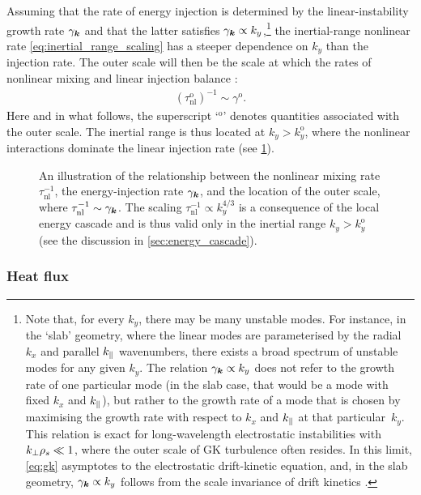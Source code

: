 \documentclass{jpp}
\newcommand{\taunl}{\tau_\text{nl}}
\newcommand{\taunlo}{\tau_\text{nl}^\text{o}}
\newcommand{\kyo}{k_y^\text{o}}
\newcommand{\gammao}{\gamma^\text{o}}
\begin{document}
Assuming that the rate of energy injection is determined by the linear-instability growth rate \(\gamma_{\boldsymbol{k}}\) and that the latter satisfies \(\gamma_{\boldsymbol{k}} \propto k_y\),\footnote{\label{footnote:gamma_ky}Note that, for every \(k_y\), there may be many unstable modes. For instance, in the `slab' geometry, where the linear modes are parameterised by the radial \(k_x\) and parallel \(k_\parallel\) wavenumbers, there exists a broad spectrum of unstable modes for any given \(k_y\). The relation \mbox{\(\gamma_{\boldsymbol{k}} \propto k_y\)} does not refer to the growth rate of one particular mode (in the slab case, that would be a mode with fixed \(k_x\) and \(k_\parallel\)), but rather to the growth rate of a mode that is chosen by maximising the growth rate with respect to \(k_x\) and \(k_\parallel\) at that particular~\(k_y\). This relation is exact for long-wavelength electrostatic instabilities with \(k_\perp\rho_s \ll 1\), where the outer scale of GK turbulence often resides. In this limit, \cref{eq:gk} asymptotes to the electrostatic drift-kinetic equation, and, in the slab geometry, \(\gamma_{\boldsymbol{k}} \propto k_y\) follows from the scale invariance of drift kinetics \citep{adkins23}.} the inertial-range nonlinear rate \cref{eq:inertial_range_scaling} has a steeper dependence on \(k_y\) than the injection rate. The outer scale will then be the scale at which the rates of nonlinear mixing and linear injection balance \citep{barnes11,adkins22, adkins23}:
\begin{align}
	\left(\taunlo\right)^{-1} \sim \gammao.
	\label{eq:outer_scale_def}
\end{align}
Here and in what follows, the superscript `\(^\text{o}\)' denotes quantities associated with the outer scale. The inertial range is thus located at \(k_y > \kyo\), where the nonlinear interactions dominate the linear injection rate (see \cref{fig:outer_scale_unsheared}).

\begin{figure}
	\centering
	\scalebox{1.0}{}
	\caption{An illustration of the relationship between the nonlinear mixing rate \(\taunl^{-1}\), the energy-injection rate \(\gamma_{\boldsymbol{k}}\), and the location of the outer scale, where \(\taunl^{-1} \sim \gamma_\vk\). The scaling \(\taunl^{-1}\propto k_y^{4/3}\) is a consequence of the local energy cascade and is thus valid only in the inertial range \(k_y > \kyo\) (see the discussion in \cref{sec:energy_cascade}).}
	\label{fig:outer_scale_unsheared}
\end{figure}

\subsubsection{Heat flux}
\label{sec:heatflux}
\end{document}

